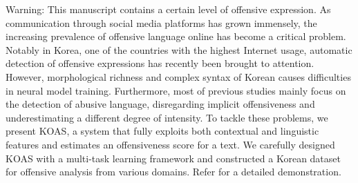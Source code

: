 Warning: This manuscript contains a certain level of offensive expression.
As communication through social media platforms has grown immensely, the increasing prevalence of offensive language online has become a critical problem. Notably in Korea, one of the countries with the highest Internet usage, automatic detection of offensive expressions has recently been brought to attention. However, morphological richness and complex syntax of Korean causes difficulties in neural model training. Furthermore, most of previous studies mainly focus on the detection of abusive language, disregarding implicit offensiveness and underestimating a different degree of intensity.
To tackle these problems, we present KOAS, a system that fully exploits both contextual and linguistic features and estimates an offensiveness score for a text. We carefully designed KOAS with a multi-task learning framework and constructed a Korean dataset for offensive analysis from various domains. Refer for a detailed demonstration.